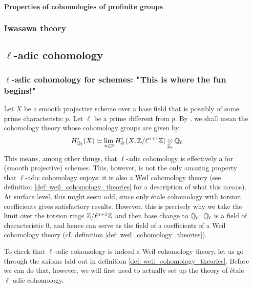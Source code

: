                 \paragraph{Properties of cohomologies of profinite groups}
            
            \subsubsection{Iwasawa theory}
    
        \subsection{\texorpdfstring{$\ell$}{}-adic cohomology}
            \subsubsection{\texorpdfstring{$\ell$}{}-adic cohomology for schemes: "This is where the fun begins!"}
                Let $X$ be a smooth projective scheme over a base field that is possibly of some prime characteristic $p$. Let $\ell$ be a prime different from $p$. By , we shall mean the cohomology theory whose cohomology groups are given by:
                    $$H^i_{\Q_{\ell}}(X) \cong \underset{n \in \N}{\lim} H_{\et}^i(X, \Z/\ell^{n + 1}\Z) \tensor_{\Z_{\ell}} \Q_{\ell}$$
                This means, among other things, that $\ell$-adic cohomology is effectively a  for (smooth projective) schemes. This, however, is not the only amazing property that $\ell$-adic cohomology enjoys: it is also a Weil cohomology theory (see definition \ref{def: weil_cohomology_theories} for a description of what this means). At surface level, this might seem odd, since only \'etale cohomology with torsion coefficients gives satisfactory results. However, this is precisely why we take the limit over the torsion rings $\mathbb{Z}/\ell^{n + 1}\mathbb{Z}$ and then base change to $\mathbb{Q}_{\ell}$: $\mathbb{Q}_{\ell}$ is a field of characteristic $0$, and hence can serve as the field of a coefficients of a Weil cohomology theory (cf. definition \ref{def: weil_cohomology_theories}). 
                
                To check that $\ell$-adic cohomology is indeed a Weil cohomology theory, let us  go through the axioms laid out in definition \ref{def: weil_cohomology_theories}. Before we can do that, however, we will first need to actually set up the theory of \'etale $\ell$-adic cohomology.
                
